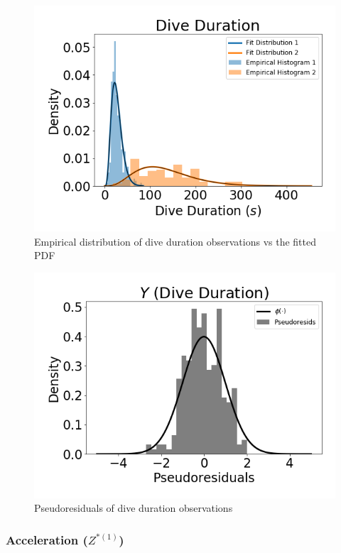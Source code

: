 \documentclass[12pt]{TD-CJS}
\begin{document}
\begin{figure}
    \centering
    \includegraphics[width=5in]{../Plots/empirical_hist_dive_duration.png}
    \caption{Empirical distribution of dive duration observations vs the fitted PDF}
\end{figure}

\begin{figure}
    \centering
    \includegraphics[width=5in]{../Plots/psedoresids_Dive_Duration.png}
    \caption{Pseudoresiduals of dive duration observations}
\end{figure}

\subsubsection{Acceleration ($Z^{*(1)}$)}
\end{document}
